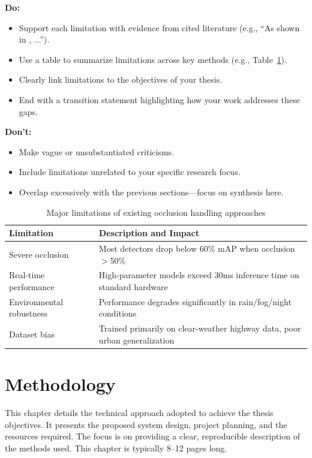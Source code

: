 \documentclass[12pt,a4paper]{report}
\theoremstyle{definition}
\theoremstyle{remark}
\begin{document}
\noindent \textbf{Do:}
\begin{itemize}
    \item Support each limitation with evidence from cited literature (e.g., ``As shown in \cite{book1}, ...'').
    \item Use a table to summarize limitations across key methods (e.g., Table~\ref{tab:limitations}).
    \item Clearly link limitations to the objectives of your thesis.
    \item End with a transition statement highlighting how your work addresses these gaps.
\end{itemize}

\noindent \textbf{Don’t:}
\begin{itemize}
    \item Make vague or unsubstantiated criticisms.
    \item Include limitations unrelated to your specific research focus.
    \item Overlap excessively with the previous sections—focus on synthesis here.
\end{itemize}

\begin{table}[htbp]
    \centering
    \caption{Major limitations of existing occlusion handling approaches}
    \label{tab:limitations}
    \begin{tabular}{|l|p{8cm}|}
    \hline
    \textbf{Limitation} & \textbf{Description and Impact} \\
    \hline
    Severe occlusion & Most detectors drop below 60\% mAP when occlusion $>$50\% \cite{article1} \\
    Real-time performance & High-parameter models exceed 30ms inference time on standard hardware \cite{conference1} \\
    Environmental robustness & Performance degrades significantly in rain/fog/night conditions \cite{online1} \\
    Dataset bias & Trained primarily on clear-weather highway data, poor urban generalization \\
    \hline
    \end{tabular}
\end{table}


\chapter{Methodology}

This chapter details the technical approach adopted to achieve the thesis objectives. It presents the proposed system design, project planning, and the resources required. The focus is on providing a clear, reproducible description of the methods used. This chapter is typically 8--12 pages long.
\end{document}
